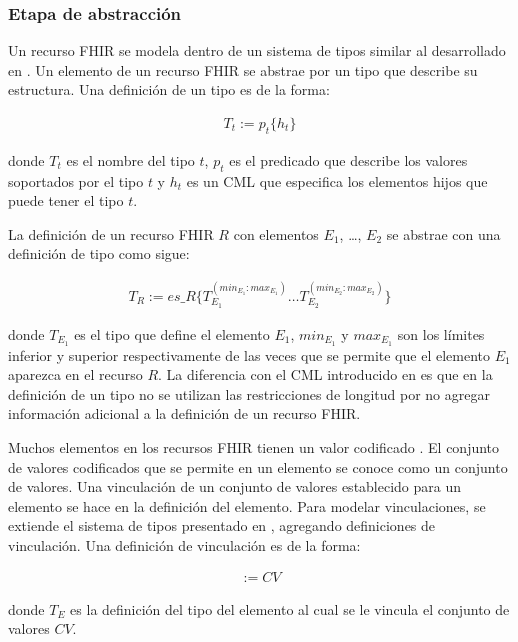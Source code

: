 \subsubsection{Etapa de abstracción}

Un recurso FHIR se modela dentro de un sistema de tipos similar al desarrollado en \cite{Maldonado09}. Un elemento de un recurso FHIR se abstrae por un tipo que describe su estructura. Una definición de un tipo es de la forma:

\begin{align*}
T_t:=p_t\{h_t\}
\end{align*}

donde \(T_t\) es el nombre del tipo \(t\), \(p_t\) es el predicado que describe los valores soportados por el tipo \(t\) y \(h_t\) es un CML que especifica los elementos hijos que puede tener el tipo \(t\).

La definición de un recurso FHIR \(R\) con elementos \(E_1\), \dots , \(E_2\) se abstrae con una definición de tipo como sigue:

\begin{align*}
T_R:=es\_R\{T_{E_1}^{(min_{E_1} \colon max_{E_1})} \dots T_{E_2}^{(min_{E_2} \colon max_{E_2})}\}
\end{align*}

donde \(T_{E_1}\) es el tipo que define el elemento \(E_1\), \(min_{E_1}\) y \(max_{E_1}\) son los límites inferior y superior respectivamente de las veces que se permite que el elemento \(E_1\) aparezca en el recurso \(R\). La diferencia con el CML introducido en \cite{Maldonado09} es que en la definición de un tipo no se utilizan las restricciones de longitud por no agregar información adicional a la definición de un recurso FHIR.

Muchos elementos en los recursos FHIR tienen un valor codificado \cite{FHIRTerminology}. El conjunto de valores codificados que se permite en un elemento se conoce como un conjunto de valores. Una vinculación de un conjunto de valores establecido para un elemento se hace en la definición del elemento. Para modelar vinculaciones, se extiende el sistema de tipos presentado en \cite{Maldonado09}, agregando definiciones de vinculación. Una definición de vinculación es de la forma:

\begin{align*}
[T_E] := CV
\end{align*}

donde \(T_E\) es la definición del tipo del elemento al cual se le vincula el conjunto de valores \(CV\).


